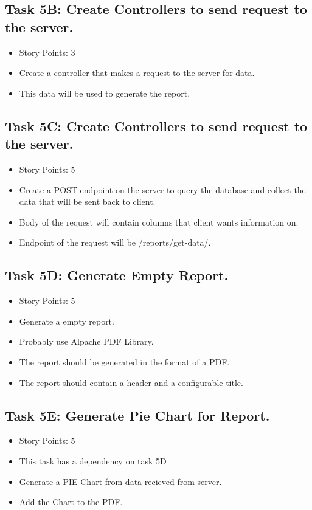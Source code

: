 \documentclass[12pt]{article}
\begin{document}
\subsection{Task 5B: Create Controllers to send request to the server.}
\begin{itemize}%
\item Story Points: 3
\item Create a controller that makes a request to the server for data.
\item This data will be used to generate the report. 
\end{itemize}

\subsection{Task 5C: Create Controllers to send request to the server.}
\begin{itemize}%
\item Story Points: 5
\item Create a POST endpoint on the server to query the database and collect the data that will be sent back to client.
\item Body of the request will contain columns that client wants information on. 
\item Endpoint of the request will be /reports/get-data/.
\end{itemize}

\subsection{Task 5D: Generate Empty Report.}
\begin{itemize}%
\item Story Points: 5
\item Generate a empty report. 
\item Probably use Alpache PDF Library.
\item The report should be generated in the format of a PDF.
\item The report should contain a header and a configurable title.
\end{itemize}

\subsection{Task 5E: Generate Pie Chart for Report.}
\begin{itemize}%
\item Story Points: 5
\item This task has a dependency on task 5D
\item Generate a PIE Chart from data recieved from server.
\item Add the Chart to the PDF.
\end{itemize}
\end{document}
